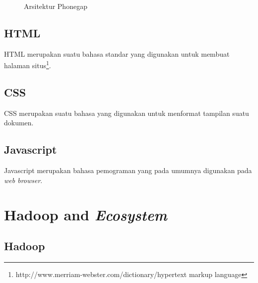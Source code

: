 \begin{figure}
\centering
{}
\caption[Arsitektur Phonegap]{Arsitektur Phonegap} 
\label{fig:arsitektur_phonegap}
\end{figure}

\subsection{HTML}
\label{subsec:html}

HTML merupakan suatu bahasa standar yang digunakan untuk membuat halaman situs\footnote{http://www.merriam-webster.com/dictionary/hypertext markup language}.

\subsection{CSS}
\label{subsec:css}

CSS merupakan suatu bahasa yang digunakan untuk menformat tampilan suatu dokumen.

\subsection{Javascript}
\label{subsec:javascript}

Javascript merupakan bahasa pemograman yang pada umumnya digunakan pada \textit{web browser}.

\section{Hadoop and \textit{Ecosystem}}
\label{sec:hadoopandecosystem}

\subsection{Hadoop}
\label{subsec:hadoop}

